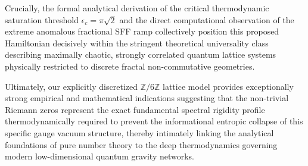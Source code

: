 \documentclass[aps,prl,preprint,superscriptaddress,floatfix]{revtex4-2}
\newcommand{\Zmod}{\mathbb{Z}/6\mathbb{Z}}
\begin{document}
Crucially, the formal analytical derivation of the critical thermodynamic saturation threshold $\epsilon_c = \pi\sqrt{2}$ and the direct computational observation of the extreme anomalous fractional SFF ramp collectively position this proposed Hamiltonian decisively within the stringent theoretical universality class describing maximally chaotic, strongly correlated quantum lattice systems physically restricted to discrete fractal non-commutative geometries.

Ultimately, our explicitly discretized $\Zmod$ lattice model provides exceptionally strong empirical and mathematical indications suggesting that the non-trivial Riemann zeros represent the exact fundamental spectral rigidity profile thermodynamically required to prevent the informational entropic collapse of this specific gauge vacuum structure, thereby intimately linking the analytical foundations of pure number theory to the deep thermodynamics governing modern low-dimensional quantum gravity networks.
\end{document}
